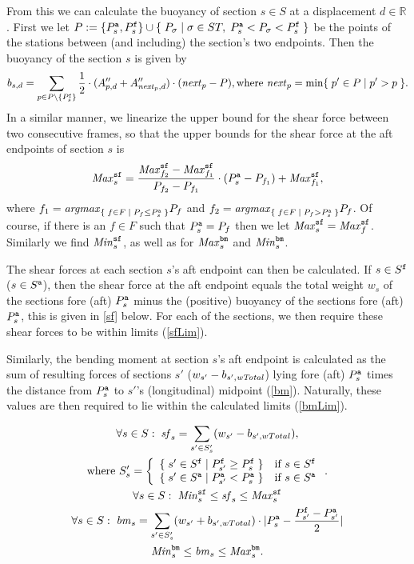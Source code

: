 From this we can calculate the buoyancy of section $s \in S$ at a displacement $d\in \mathbb{R}$. First we let $P := \{P^{\texttt{a}}_s, P^{\texttt{f}}_s\} \cup \{\;{P_\sigma}\;|\;{\sigma\in ST,\; P^{\texttt{a}}_s < P_\sigma < P^{\texttt{f}}_s}\;\}$ be the points of the stations between (and including) the section's two endpoints. Then the buoyancy of the section $s$ is given by
\[
b_{s,d} = \sum_{p \in P\setminus \{P^{\texttt{f}}_s\}} \frac{1}{2}\cdot(A''_{p,d}+A''_{\mathit{next}_p,d})\cdot (\mathit{next}_p-P), \text{where } \mathit{next}_p = \min\{\;{p' \in P}\;|\;{p' > p}\;\}.
\]
In a similar manner, we linearize the upper bound for the shear force between two consecutive frames, so that the upper bounds for the shear force at the aft endpoints of section $s$ is
\[
\mathit{Max}^{\texttt{sf}}_s = \frac{\mathit{Max}^{\texttt{sf}}_{f_2}-\mathit{Max}^{\texttt{sf}}_{f_1}}{P_{f_2}-P_{f_1}}\cdot(P^{\texttt{a}}_s - P_{f_1}) + \mathit{Max}^{\texttt{sf}}_{f_1}, 
\]
where $f_1 = \mathit{argmax}_{\{\;{f\in F}\;|\;{P_f\leq P^{\texttt{a}}_s}\;\}}P_f$ and $f_2 = \mathit{argmax}_{\{\;{f\in F}\;|\;{P_f>P^{\texttt{a}}_s}\;\}}P_f$. Of course, if there is an $f\in F$ such that $P^{\texttt{a}}_s = P_f$ then we let $\mathit{Max}^{\texttt{sf}}_s = \mathit{Max}^{\texttt{sf}}_f$. Similarly we find $\mathit{Min}^{\texttt{sf}}_s$, as well as for $\mathit{Max}^{\texttt{bm}}_s$ and $\mathit{Min}^{\texttt{bm}}_s$.   

The shear forces at each section $s$'s aft endpoint can then be calculated. If $s\in S^{\texttt{f}}$ ($s\in S^{\texttt{a}}$), then the shear force at the aft endpoint equals the total weight $w_s$ of the sections fore (aft) $P^{\texttt{a}}_s$ minus the (positive) buoyancy of the sections fore (aft) $P^{\texttt{a}}_s$, this is given in \eqref{sf} below. For each of the sections, we then require these shear forces to be within limits (\ref{sfLim}).   

Similarly, the bending moment at section $s$'s aft endpoint is calculated as the sum of resulting forces of sections $s'$ ($w_{s'} - b_{s', \mathit{wTotal}}$) lying fore (aft) $P^{\texttt{a}}_s$ times the distance from $P^{\texttt{a}}_s$ to $s'$'s (longitudinal) midpoint (\ref{bm}). Naturally, these values are then required to lie within the calculated limits (\ref{bmLim}).

\begin{gather}
\label{sf}
\forall s \in S:\;
\mi{sf}_s = \sum_{s' \in S'_s} (w_{s'} - b_{s',wTotal}),\\
\nonumber \text{where }S'_s = \left\{
\begin{array}{ll} \set{s' \in S^\trt{f}}{P^\trt{f}_{s'} \geq P^\trt{f}_s}&\text{if }s \in S^\trt{f}\\
									\set{s' \in S^\trt{a}}{P^\trt{a}_{s'} < P^\trt{a}_s}&\text{if }s \in S^\trt{a}\end{array}\right..
\\
\label{sfLim}\forall s \in S:\;
\mi{Min}^\trt{sf}_s \leq \mi{sf}_s \leq \mi{Max}^\trt{sf}_s\\
%
\label{bm}\forall s \in S:\;
\mi{bm}_s = 	\sum_{s' \in S'_s} (w_{s'} + b_{s',wTotal})\cdot |P^\trt{a}_s - \frac{P^\trt{f}_{s'}-P^\trt{a}_{s'}}{2}|\\
%
\label{bmLim}
\mi{Min}^\trt{bm}_s \leq \mi{bm}_s \leq \mi{Max}^\trt{bm}_s. 
\end{gather}


